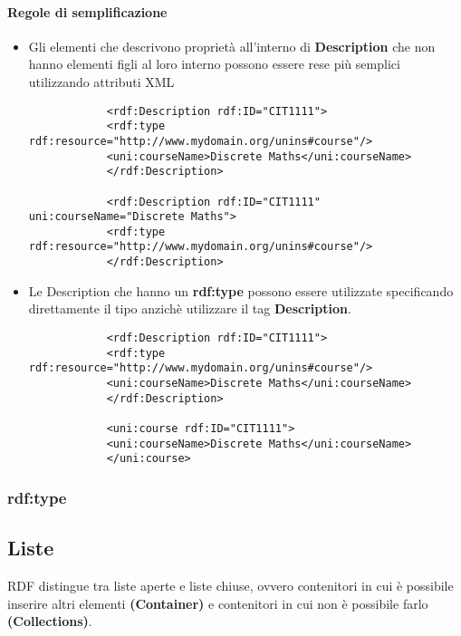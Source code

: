 \paragraph{Regole di semplificazione}
\begin{itemize}
	\item Gli elementi che descrivono proprietà all'interno di \textbf{Description} che non hanno elementi figli al loro interno possono essere rese più semplici utilizzando attributi XML
	\begin{info}[Esempio]
		\begin{verbatim}
			<rdf:Description rdf:ID="CIT1111">
			<rdf:type rdf:resource="http://www.mydomain.org/unins#course"/>
			<uni:courseName>Discrete Maths</uni:courseName>
			</rdf:Description>

			<rdf:Description rdf:ID="CIT1111" uni:courseName="Discrete Maths">
			<rdf:type rdf:resource="http://www.mydomain.org/unins#course"/>
			</rdf:Description>
		\end{verbatim}
	\end{info}
	\item Le Description che hanno un \textbf{rdf:type} possono essere utilizzate specificando direttamente il tipo anzichè utilizzare il tag \textbf{Description}.
	\begin{info}[Esempio]
		\begin{verbatim}
			<rdf:Description rdf:ID="CIT1111">
			<rdf:type rdf:resource="http://www.mydomain.org/unins#course"/>
			<uni:courseName>Discrete Maths</uni:courseName>
			</rdf:Description>

			<uni:course rdf:ID="CIT1111">
			<uni:courseName>Discrete Maths</uni:courseName>
			</uni:course>
		\end{verbatim}
	\end{info}
\end{itemize}

\subsubsection{rdf:type}

\subsection{Liste}
RDF distingue tra liste aperte e liste chiuse, ovvero contenitori in cui è possibile inserire altri elementi \textbf{(Container)} e contenitori in cui non è possibile farlo \textbf{(Collections)}.

